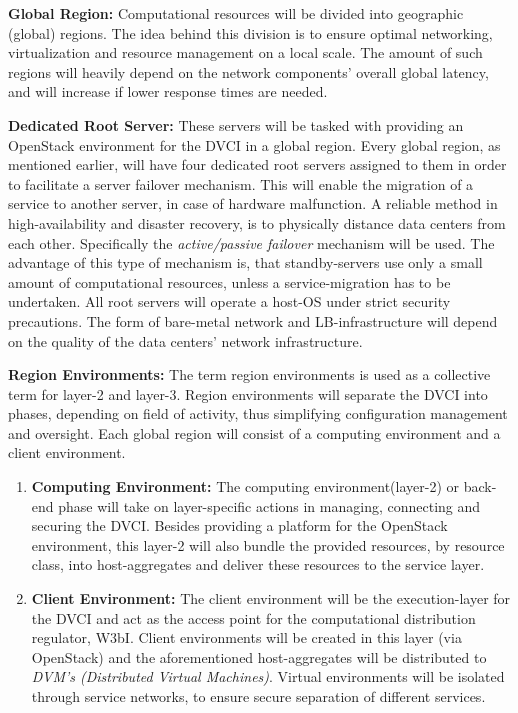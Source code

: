 \documentclass[]{article}
\begin{document}
\textbf{Global Region:} 
Computational resources will be divided into geographic (global) regions.
The idea behind this division is to ensure optimal networking, virtualization and resource management on a local scale.
The amount of such regions will heavily depend on the network components' overall global latency, and will increase if lower response times are needed.
\newline

\textbf{Dedicated Root Server:}
These servers will be tasked with providing an OpenStack environment for the DVCI in a global region.
Every global region, as mentioned earlier, will have four dedicated root servers assigned to them in order to facilitate a server failover mechanism. This will enable the migration of a service to another server, in case of hardware malfunction.
A reliable method in high-availability and disaster recovery, is to physically distance data centers from each other. 
Specifically the \textit{active/passive failover} mechanism will be used.
The advantage of this type of mechanism is, that standby-servers use only a small amount of computational resources, unless a service-migration has to be undertaken. 
All root servers will operate a host-OS under strict security precautions. 
The form of bare-metal network and LB-infrastructure will depend on the quality of the data centers' network infrastructure.
\newline

\textbf{Region Environments:}
The term region environments is used as a collective term for layer-2 and layer-3. 
Region environments will separate the DVCI into phases, depending on field of activity, thus simplifying configuration management and oversight.
Each global region will consist of a computing environment and a client environment. 

\begin{enumerate}[label=\textbullet]
	\item\textbf{Computing Environment:}
	The computing environment(layer-2) or back-end phase will take on layer-specific actions in managing, connecting and securing the DVCI. 
	Besides providing a platform for the OpenStack environment, this layer-2 will also bundle the provided resources, by resource class, into host-aggregates and deliver these resources to the service layer.  
	
	\item\textbf{Client Environment:} 
	The client environment will be the execution-layer for the DVCI and act as the access point for the computational distribution regulator, W3bI. 
	Client environments will be created in this layer (via OpenStack) and the aforementioned host-aggregates will be distributed to \textit{DVM's (Distributed Virtual Machines)}.
	Virtual environments will be isolated through service networks, to ensure secure separation of different services. 
\end{enumerate}
\end{document}
